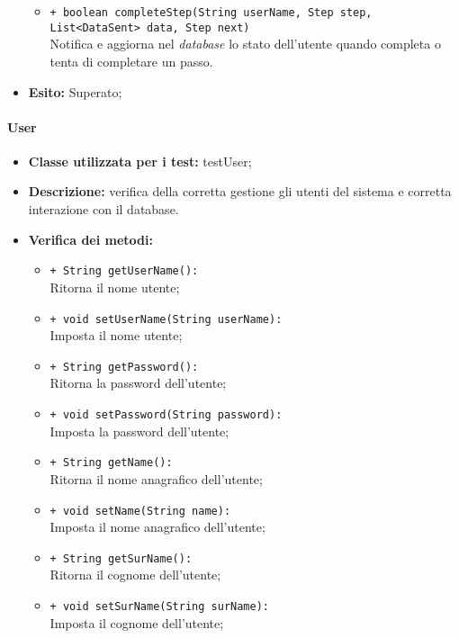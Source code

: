 \begin{flushleft}
\begin{itemize}
\begin{sloppypar}
\begin{itemize}
\item \texttt{+ boolean completeStep(String userName, Step step, List<DataSent> data, Step next)}\\Notifica e aggiorna nel \textit{database} lo stato dell'utente quando completa o tenta di completare un passo.
\end{itemize}
\end{sloppypar}
\item \textbf{Esito:} Superato;
\end{itemize}
\end{flushleft}

\paragraph{User}
\begin{flushleft}
\begin{itemize}
\item \textbf{Classe utilizzata per i test:} testUser;
\item \textbf{Descrizione:} verifica della corretta gestione gli utenti del sistema e corretta interazione con il database.
\item \textbf{Verifica dei metodi:}
\begin{sloppypar}
\begin{itemize}
\item \texttt{+ String getUserName():}\\ Ritorna il nome utente;
\item \texttt{+ void setUserName(String userName):}\\ Imposta il nome utente;
\item \texttt{+ String getPassword():}\\ Ritorna la password dell'utente;
\item \texttt{+ void setPassword(String password):}\\ Imposta la password dell'utente;
\item \texttt{+ String getName():}\\ Ritorna il nome anagrafico dell'utente;
\item \texttt{+ void setName(String name):}\\ Imposta il nome anagrafico dell'utente;
\item \texttt{+ String getSurName():}\\ Ritorna il cognome dell'utente;
\item \texttt{+ void setSurName(String surName):}\\ Imposta il cognome dell'utente;

\end{itemize}
\end{sloppypar}
\end{itemize}
\end{flushleft}
